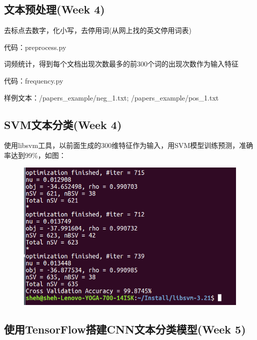 \documentclass[UTF8]{ctexart}
\begin{document}
	\subsection{文本预处理(Week 4)}
	去标点去数字，化小写，去停用词(从网上找的英文停用词表)
	
	代码：preprocess.py
	
	词频统计，得到每个文档出现次数最多的前300个词的出现次数作为输入特征
	
	代码：frequency.py
	
	样例文本：/papers\_example/neg\_1.txt; /papers\_example/pos\_1.txt	
	\subsection{SVM文本分类(Week 4)}
	使用libsvm工具，以前面生成的300维特征作为输入，用SVM模型训练预测，准确率达到99\%，如图：
	\begin{figure}
		\centering
		\includegraphics[scale=0.6]{7.png}	
	\end{figure}
	
	\subsection{使用TensorFlow搭建CNN文本分类模型(Week 5)}
	
	
\end{document}
